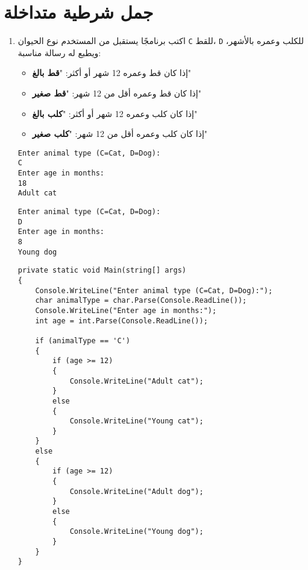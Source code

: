 \documentclass[12pt]{article}
\begin{document}
\begin{enumerate}[itemsep=3em]
\begin{enumerate}
\end{enumerate}

\section{جمل شرطية متداخلة}

\ifdetailed
\begin{enumerate}[itemsep=3em]
\else
\begin{enumerate}
\fi

\item
اكتب برنامجًا يستقبل من المستخدم نوع الحيوان \texttt{C} للقط، \texttt{D} للكلب وعمره بالأشهر، ويطبع له رسالة مناسبة:
\begin{itemize}
\item إذا كان قط وعمره 12 شهر أو أكثر: "\textbf{قط بالغ}"
\item إذا كان قط وعمره أقل من 12 شهر: "\textbf{قط صغير}"
\item إذا كان كلب وعمره 12 شهر أو أكثر: "\textbf{كلب بالغ}"
\item إذا كان كلب وعمره أقل من 12 شهر: "\textbf{كلب صغير}"
\end{itemize}
\ifdetailed
\begin{example}[1]
\begin{english}
\begin{lstlisting}
Enter animal type (C=Cat, D=Dog):
C
Enter age in months:
18
Adult cat
\end{lstlisting}
\end{english}
\end{example}
\begin{example}[2]
\begin{english}
\begin{lstlisting}
Enter animal type (C=Cat, D=Dog):
D
Enter age in months:
8
Young dog
\end{lstlisting}
\end{english}
\end{example}

\ifwithsols
\begin{solution}
\begin{english}
\begin{lstlisting}
private static void Main(string[] args)
{
    Console.WriteLine("Enter animal type (C=Cat, D=Dog):");
    char animalType = char.Parse(Console.ReadLine());
    Console.WriteLine("Enter age in months:");
    int age = int.Parse(Console.ReadLine());

    if (animalType == 'C')
    {
        if (age >= 12)
        {
            Console.WriteLine("Adult cat");
        }
        else
        {
            Console.WriteLine("Young cat");
        }
    }
    else
    {
        if (age >= 12)
        {
            Console.WriteLine("Adult dog");
        }
        else
        {
            Console.WriteLine("Young dog");
        }
    }
}
\end{lstlisting}
\end{english}
\end{solution}
\clearpage
\fi
\fi


\end{enumerate}
\end{enumerate}
\end{enumerate}
\end{document}
